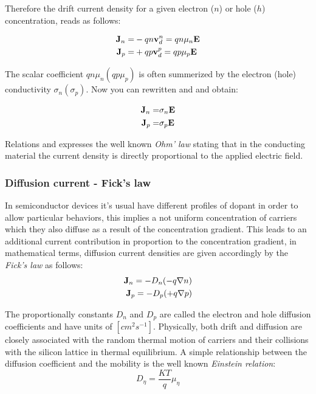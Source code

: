 Therefore the drift current density for a given electron ($n$) or hole ($h$) concentration, reads as follows:

\begin{align}
\mathbf{J}_n =& -qn\mathbf{v}_d^n = qn\mu_n\mathbf{E}  \label{eq: drift electron}\\ 
\mathbf{J}_p =& +qp\mathbf{v}_d^p = qp\mu_p\mathbf{E} \label{eq: drift hole}
\end{align}

The scalar coefficient $qn\mu_n(qp\mu_p)$ is often summerized by the electron (hole) conductivity $\sigma_n(\sigma_p)$. Now you can rewritten  and  and obtain:

\begin{align}
\mathbf{J}_n =&\sigma_n\mathbf{E}  \label{eq: ohm drift electron}\\ 
\mathbf{J}_p =& \sigma_p\mathbf{E} \label{eq: ohm drift hole}
\end{align}

Relations  and  expresses the well known \textit{Ohm' law} stating that in the conducting material  the current density is directly proportional to the applied electric field.


\subsubsection{Diffusion current - Fick's law}

In semiconductor devices it's usual have different profiles of dopant in order to allow particular behaviors, this implies a not uniform concentration of carriers which they also diffuse as a result of the concentration gradient. This leads to an additional current contribution in proportion to the concentration gradient, in mathematical terms, diffusion current densities are given accordingly by the \textit{Fick's law} as follows:
\begin{align}
\mathbf{J}_n = -D_n(-q\nabla n) \\
\mathbf{J}_p = -D_p(+q\nabla p)
\end{align}

The proportionally constants $D_n$ and $D_p$ are called the electron and hole diffusion coefficients and have units of $[cm^2s^{-1}]$. Physically, both drift and diffusion are closely associated with the random thermal motion of carriers and their collisions with the silicon lattice in thermal equilibrium. A simple relationship between the diffusion coefficient and the mobility is the well known \textit{Einstein relation}:
\begin{equation}
D_\eta = \dfrac{KT}{q}\mu_\eta
\end{equation}

